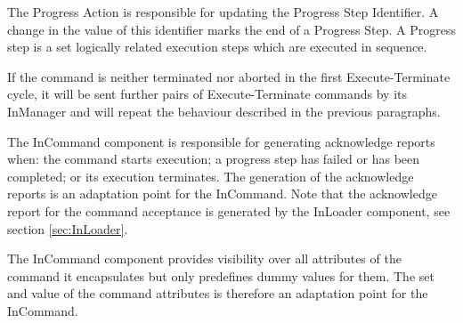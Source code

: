 The Progress Action is responsible for updating the Progress Step Identifier. A change in the value of this identifier marks the end of a Progress Step. A Progress step is a set logically related execution steps which are executed in sequence.

If the command is neither terminated nor aborted in the first Execute-Terminate cycle, it will be sent further pairs of Execute-Terminate commands by its InManager and will repeat the behaviour described in the previous paragraphs.  

The InCommand component is responsible for generating acknowledge reports when: the command starts execution; a progress step has failed or has been completed; or its execution terminates. The generation of the acknowledge reports is an adaptation point for the InCommand. Note that the acknowledge report for the command acceptance is generated by the InLoader component, see section \ref{sec:InLoader}.

The InCommand component provides visibility over all attributes of the command it encapsulates but only predefines dummy values for them. The set and value of the command attributes is therefore an adaptation point for the InCommand.


